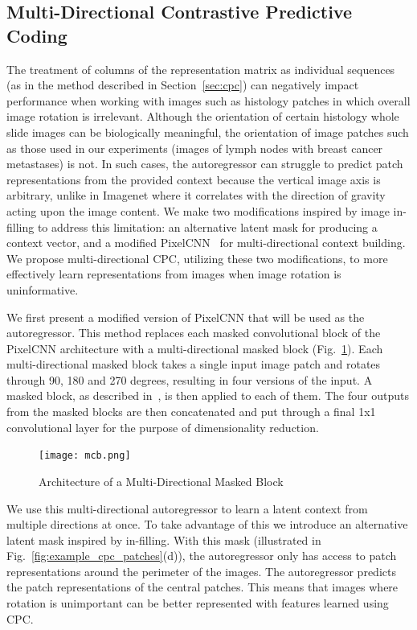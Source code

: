 \subsection{Multi-Directional Contrastive Predictive Coding}
\label{subsec:unsupervised_mlcpc}
The treatment of columns of the representation matrix as individual sequences (as in the method described in Section~\ref{sec:cpc}) can negatively impact performance when working with images such as histology patches in which overall image rotation is irrelevant. Although the orientation of certain histology whole slide images can be biologically meaningful, the orientation of image patches such as those used in our experiments (images of lymph nodes with breast cancer metastases) is not. In such cases, the autoregressor can struggle to predict patch representations from the provided context because the vertical image axis is arbitrary, unlike in Imagenet where it correlates with the direction of gravity acting upon the image content. We make two modifications inspired by image in-filling to address this limitation: an alternative latent mask for producing a context vector, and a modified PixelCNN~\cite{oord2016pixel} for multi-directional context building. We propose multi-directional CPC, utilizing these two modifications, to more effectively learn representations from images when image rotation is uninformative.

We first present a modified version of PixelCNN that will be used as the autoregressor. This method replaces each masked convolutional block of the PixelCNN architecture with a multi-directional masked block (Fig.~\ref{fig:multi-directional_masked_block}). Each multi-directional masked block takes a single input image patch and rotates through 90, 180 and 270 degrees, resulting in four versions of the input. A masked block, as described in~\cite{oord2016pixel}, is then applied to each of them. The four outputs from the masked blocks are then concatenated and put through a final 1x1 convolutional layer for the purpose of dimensionality reduction.   

\begin{figure}
	\begin{minipage}[b]{1.0\linewidth}
		\centering
		\centerline{\texttt{[image: mcb.png]}}
	\end{minipage}
	\caption{Architecture of a Multi-Directional Masked Block}
	\label{fig:multi-directional_masked_block}
\end{figure}

We use this multi-directional autoregressor to learn a latent context from multiple directions at once. To take advantage of this we introduce an alternative latent mask inspired by in-filling. With this mask (illustrated in Fig.~\ref{fig:example_cpc_patches}(d)), the autoregressor only has access to patch representations around the perimeter of the images. The autoregressor predicts the patch representations of the central patches. This means that images where rotation is unimportant can be better represented with features learned using CPC.



